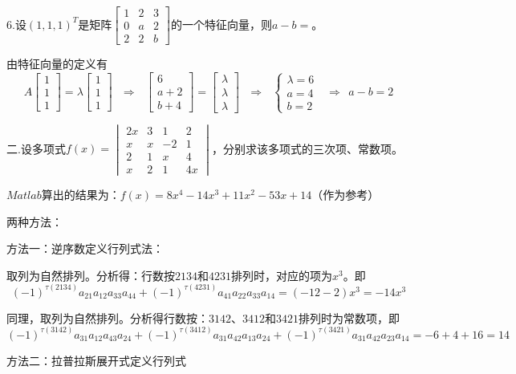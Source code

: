 \documentclass{article}
\begin{document}
6.设$(1,1,1)^{T}$是矩阵$
\begin{bmatrix}
  1 & 2 & 3 \\
  0 & a & 2\\
  2 & 2 & b
\end{bmatrix}
$的一个特征向量，则$a-b=$\underline{\hphantom{~~~~~~~~~~}}。

\begin{jie}
由特征向量的定义有
\begin{equation*}
A
\begin{bmatrix}
1\\ 1\\ 1
\end{bmatrix}=\lambda
\begin{bmatrix}
1\\ 1\\ 1
\end{bmatrix}~~~\Rightarrow~~~
\begin{bmatrix}
6\\ a+2\\ b+4
\end{bmatrix}=\begin{bmatrix}
\lambda\\ \lambda\\ \lambda
\end{bmatrix}~~~\Rightarrow~~~
\begin{cases}
\lambda=6\\
a=4\\
b=2
\end{cases}~~~\Rightarrow~~a-b=2
\end{equation*}
\end{jie}

二.设多项式$
f(x)=
\begin{vmatrix}
  2x & 3 & 1 & 2\\
  x & x & -2 & 1\\
  2 & 1 & x & 4\\
  x & 2 & 1 & 4x
\end{vmatrix}
$，分别求该多项式的三次项、常数项。

\begin{jie}
$Matlab$算出的结果为：$f(x)=8x^{4}-14x^3+11x^2-53x+14$（作为参考）

两种方法：

方法一：逆序数定义行列式法：

取列为自然排列。分析得：行数按$2134$和$4231$排列时，对应的项为$x^3$。即
\begin{equation*}
(-1)^{\tau(2134)}a_{21}a_{12}a_{33}a_{44}+(-1)^{\tau(4231)}a_{41}a_{22}a_{33}a_{14}=(-12-2)x^{3}=-14x^3
\end{equation*}

同理，取列为自然排列。分析得行数按：$3142$、$3412$和$3421$排列时为常数项，即
\begin{equation*}
(-1)^{\tau(3142)}a_{31}a_{12}a_{43}a_{24}+(-1)^{\tau(3412)}a_{31}a_{42}a_{13}a_{24}+(-1)^{\tau(3421)}a_{31}a_{42}a_{23}a_{14}=-6+4+16=14
\end{equation*}

方法二：拉普拉斯展开式定义行列式


\end{jie}
\end{document}
